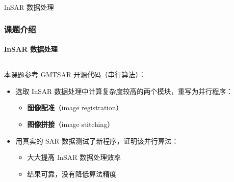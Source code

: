 \documentclass{beamer}
\begin{document}
\begin{frame}{InSAR 数据处理}
    \frametitle{课题介绍}
    \framesubtitle{InSAR 数据处理}

    \begin{columns}
        \begin{column}{0.6\textwidth}
            \begin{footnotesize}
                本课题参考 GMTSAR 开源代码（串行算法）：
                \begin{itemize}
                    \footnotesize
                    \item 选取 InSAR 数据处理中计算复杂度较高的两个模块，重写为并行程序：
                        \begin{itemize}
                            \footnotesize
                            \item \textbf{图像配准}（image registration）
                            \item \textbf{图像拼接}（image stitching）
                        \end{itemize}
                    \item 用真实的 SAR 数据测试了新程序，证明该并行算法：
                        \begin{itemize}
                            \footnotesize
                            \item 大大提高 InSAR 数据处理效率
                            \item 结果可靠，没有降低算法精度
                        \end{itemize}
                \end{itemize}
            \end{footnotesize}
        \end{column}
        \begin{column}{0.4\textwidth}

\end{column}
\end{columns}
\end{frame}
\end{document}
